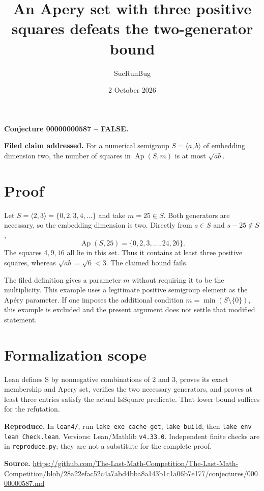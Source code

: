 \documentclass[11pt]{article}
\title{An Apery set with three positive squares defeats the two-generator bound}
\author{SucRunBug}
\date{2 October 2026}
\begin{document}
\maketitle
\textbf{Conjecture 00000000587 -- FALSE.}

\textbf{Filed claim addressed.} For a numerical semigroup $S=\langle a,b\rangle$ of embedding dimension two, the number of squares in $\operatorname{Ap}(S,m)$ is at most $\sqrt{ab}$.

\section*{Proof}
Let $S=\langle2,3\rangle=\{0,2,3,4,\ldots\}$ and take $m=25\in S$. Both generators are necessary, so the embedding dimension is two. Directly from $s\in S$ and $s-25\notin S$,
\[\operatorname{Ap}(S,25)=\{0,2,3,\ldots,24,26\}.\]
The squares $4,9,16$ all lie in this set. Thus it contains at least three positive squares, whereas $\sqrt{ab}=\sqrt6<3$. The claimed bound fails.

The filed definition gives a parameter $m$ without requiring it to be the multiplicity. This example uses a legitimate positive semigroup element as the Ap\'ery parameter. If one imposes the additional condition $m=\min(S\setminus\{0\})$, this example is excluded and the present argument does not settle that modified statement.

\section*{Formalization scope}
Lean defines S by nonnegative combinations of 2 and 3, proves its exact membership and Apery set, verifies the two necessary generators, and proves at least three entries satisfy the actual IsSquare predicate. That lower bound suffices for the refutation.

\textbf{Reproduce.} In \texttt{lean4/}, run \texttt{lake exe cache get},
\texttt{lake build}, then \texttt{lake env lean Check.lean}. Versions:
Lean/Mathlib \texttt{v4.33.0}. Independent finite checks are in
\texttt{reproduce.py}; they are not a substitute for the complete proof.

\textbf{Source.} \url{https://github.com/The-Last-Math-Competition/The-Last-Math-Competition/blob/28a22efac52c4a7abd4bba8a143b1c1a06b7e177/conjectures/00000000587.md}
\end{document}
